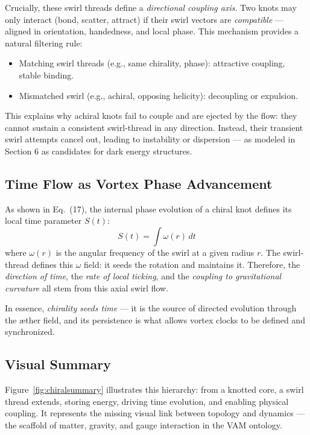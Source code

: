 \documentclass[a4paper,12pt]{article}
\begin{document}
    Crucially, these swirl threads define a \textit{directional coupling axis}. Two knots may only interact (bond, scatter, attract) if their swirl vectors are \textit{compatible} — aligned in orientation, handedness, and local phase. This mechanism provides a natural filtering rule:
    \begin{itemize}
        \item Matching swirl threads (e.g., same chirality, phase): attractive coupling, stable binding.
        \item Mismatched swirl (e.g., achiral, opposing helicity): decoupling or expulsion.
    \end{itemize}
    This explains why achiral knots fail to couple and are ejected by the flow: they cannot sustain a consistent swirl-thread in any direction. Instead, their transient swirl attempts cancel out, leading to instability or dispersion — as modeled in Section 6 as candidates for dark energy structures.

    \subsection{Time Flow as Vortex Phase Advancement}

    As shown in Eq.~(17), the internal phase evolution of a chiral knot defines its local time parameter $S(t)$:
    \[
        S(t) = \int \omega(r) \, dt
    \]
    where $\omega(r)$ is the angular frequency of the swirl at a given radius $r$. The swirl-thread defines this $\omega$ field: it seeds the rotation and maintains it. Therefore, the \textit{direction of time}, the \textit{rate of local ticking}, and the \textit{coupling to gravitational curvature} all stem from this axial swirl flow.

    In essence, \textit{chirality seeds time} — it is the source of directed evolution through the æther field, and its persistence is what allows vortex clocks to be defined and synchronized.

    \subsection{Visual Summary}

    Figure~\ref{fig:chiralsummary} illustrates this hierarchy: from a knotted core, a swirl thread extends, storing energy, driving time evolution, and enabling physical coupling. It represents the missing visual link between topology and dynamics — the scaffold of matter, gravity, and gauge interaction in the VAM ontology.
\end{document}

